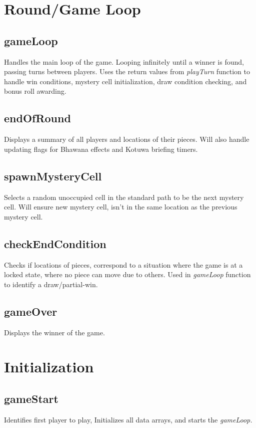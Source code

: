 \documentclass{article}
\begin{document}
\section{Round/Game Loop}

\subsection{gameLoop}
Handles the main loop of the game. Looping infinitely until a winner is found, passing turns between players. Uses the return values from \textit{playTurn} function to handle win conditions, mystery cell initialization, draw condition checking, and bonus roll awarding.

\subsection{endOfRound}
Displays a summary of all players and locations of their pieces. Will also handle updating flags for Bhawana effects and Kotuwa briefing timers.

\subsection{spawnMysteryCell}
Selects a random unoccupied cell in the standard path to be the next mystery cell. Will ensure new mystery cell, isn't in the same location as the previous mystery cell.

\subsection{checkEndCondition}
Checks if locations of pieces, correspond to a situation where the game is at a locked state, where no piece can move due to others. Used in \textit{gameLoop} function to identify a draw/partial-win.

\subsection{gameOver}
Displays the winner of the game.

\section{Initialization}

\subsection{gameStart}
Identifies first player to play, Initializes all data arrays, and starts the \textit{gameLoop.}
\end{document}
